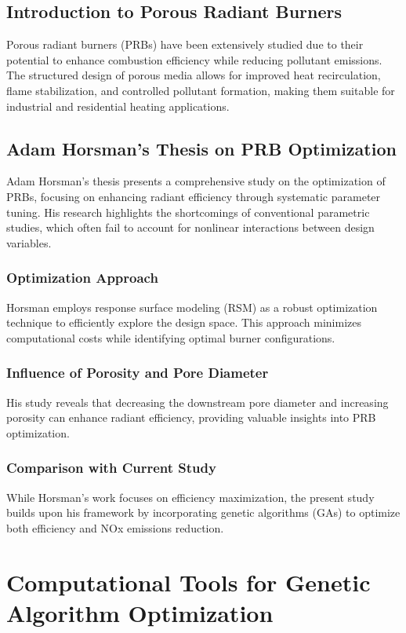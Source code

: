 \documentclass[12pt]{report}
\begin{document}
\subsection{Introduction to Porous Radiant Burners}
Porous radiant burners (PRBs) have been extensively studied due to their potential to enhance combustion efficiency while reducing pollutant emissions. The structured design of porous media allows for improved heat recirculation, flame stabilization, and controlled pollutant formation, making them suitable for industrial and residential heating applications.

\subsection{Adam Horsman’s Thesis on PRB Optimization}
Adam Horsman’s thesis \cite{horsman2010} presents a comprehensive study on the optimization of PRBs, focusing on enhancing radiant efficiency through systematic parameter tuning. His research highlights the shortcomings of conventional parametric studies, which often fail to account for nonlinear interactions between design variables.

\subsubsection{Optimization Approach}
Horsman employs response surface modeling (RSM) as a robust optimization technique to efficiently explore the design space. This approach minimizes computational costs while identifying optimal burner configurations.

\subsubsection{Influence of Porosity and Pore Diameter}
His study reveals that decreasing the downstream pore diameter and increasing porosity can enhance radiant efficiency, providing valuable insights into PRB optimization.

\subsubsection{Comparison with Current Study}
While Horsman’s work focuses on efficiency maximization, the present study builds upon his framework by incorporating genetic algorithms (GAs) to optimize both efficiency and NOx emissions reduction.

\section{Computational Tools for Genetic Algorithm Optimization}
\end{document}
